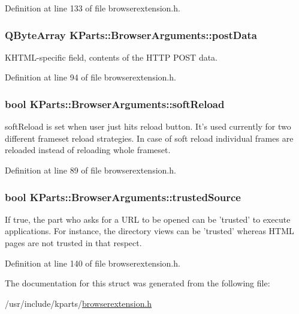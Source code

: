 Definition at line 133 of file browserextension.\+h.

\hypertarget{structKParts_1_1BrowserArguments_a9c1fb6cb602a10fec4ca05a25f1b9ac6}{
\subsubsection[{post\+Data}]{\setlength{\rightskip}{0pt plus 5cm}Q\+Byte\+Array K\+Parts\+::\+Browser\+Arguments\+::post\+Data}}\label{structKParts_1_1BrowserArguments_a9c1fb6cb602a10fec4ca05a25f1b9ac6}
K\+H\+T\+M\+L-\/specific field, contents of the H\+T\+T\+P P\+O\+S\+T data. 

Definition at line 94 of file browserextension.\+h.

\hypertarget{structKParts_1_1BrowserArguments_af06b08da058cd6fc19ad42e2904e2594}{
\subsubsection[{soft\+Reload}]{\setlength{\rightskip}{0pt plus 5cm}bool K\+Parts\+::\+Browser\+Arguments\+::soft\+Reload}}\label{structKParts_1_1BrowserArguments_af06b08da058cd6fc19ad42e2904e2594}
{\ttfamily soft\+Reload} is set when user just hits reload button. It's used currently for two different frameset reload strategies. In case of soft reload individual frames are reloaded instead of reloading whole frameset. 

Definition at line 89 of file browserextension.\+h.

\hypertarget{structKParts_1_1BrowserArguments_aa9e31eabaee6af2692319d21721fc9cb}{
\subsubsection[{trusted\+Source}]{\setlength{\rightskip}{0pt plus 5cm}bool K\+Parts\+::\+Browser\+Arguments\+::trusted\+Source}}\label{structKParts_1_1BrowserArguments_aa9e31eabaee6af2692319d21721fc9cb}
If true, the part who asks for a U\+R\+L to be opened can be 'trusted' to execute applications. For instance, the directory views can be 'trusted' whereas H\+T\+M\+L pages are not trusted in that respect. 

Definition at line 140 of file browserextension.\+h.



The documentation for this struct was generated from the following file\+:\begin{DoxyCompactItemize}
\item 
/usr/include/kparts/\hyperlink{browserextension_8h}{browserextension.\+h}\end{DoxyCompactItemize}
